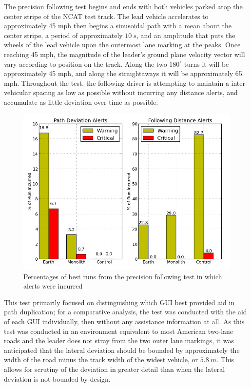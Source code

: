 \documentclass[twocolumn,10pt]{article}
\begin{document}
    The precision following test begins and ends with both vehicles parked atop the center stripe of the NCAT test track.  The lead vehicle accelerates to approximately 45 mph then begins a sinusoidal path with a mean about the center stripe, a period of approximately $10~s$, and an amplitude that puts the wheels of the lead vehicle upon the outermost lane marking at the peaks.  Once reaching 45 mph, the magnitude of the leader’s ground plane velocity vector will vary according to position on the track.  Along the two $180^{\circ}$ turns it will be approximately 45 mph, and along the straightaways it will be approximately 65 mph.  Throughout the test, the following driver is attempting to maintain a inter-vehicular spacing as low as possible without incurring any distance alerts, and accumulate as little deviation over time as possible.

    \begin{figure}[ht] \centering
      \includegraphics[width=\columnwidth]{../graphics/precision_following_alert_percents.png}
      \caption{Percentages of best runs from the precision following test in which alerts were incurred}
      \label{fig:precision_following_alert_percents}
    \end{figure}

    This test primarily focused on distinguishing which GUI best provided aid in path duplication; for a comparative analysis, the test was conducted with the aid of each GUI individually, then without any assistance information at all.  As this test was conducted in an environment equivalent to most American two-lane roads and the leader does not stray from the two outer lane markings, it was anticipated that the lateral deviation should be bounded by approximately the width of the road minus the track width of the widest vehicle, or $5.8~m$.  This allows for scrutiny of the deviation in greater detail than when the lateral deviation is not bounded by design.
\end{document}
